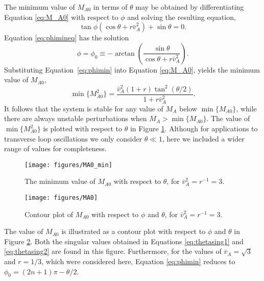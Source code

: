 The minimum value of $M_{A0}$ in terms of $\theta$ may be obtained by differentiating Equation \eqref{eq:M_A0} with respect to $\phi$ and solving the resulting equation,
\begin{equation}
\label{eq:phimineq}
\tan\phi(\cos\theta + r \bar v_A^2) + \sin\theta = 0.
\end{equation}
Equation \eqref{eq:phimineq} has the solution
%
\begin{equation}
\label{eq:phimin}
\phi = \phi_0 \equiv -\arctan \left(\frac{ \sin\theta}{\cos\theta + r \bar v_{A}^2}\right).
\end{equation}
%
Substituting Equation~\eqref{eq:phimin} into Equation \eqref{eq:M_A0}, yields the minimum value of $M_{A0}$,
%
\begin{equation}
\label{eq:M_A0min}
\min \{ M_{A0}^2 \} = \frac{\bar v_{A}^2 (1 + r)\tan^2(\theta/2)}{1 + r \bar v_{A}^2} .
\end{equation}
%
It follows that the system is stable for any value of $M_A$ below $\min\{M_{A0}\}$, while there are always unstable perturbations when $M_A > \min\{M_{A0}\}$.
The value of $\min \{ M_{A0}^2 \}$ is plotted with respect to $\theta$ in Figure \ref{fig:M_A0_min}.
Although for applications to transverse loop oscillations we only consider $\theta \ll 1$, here we included a wider range of values for completeness.

\begin{figure}[t]
\centering
\texttt{[image: figures/MA0\_min]}
\caption{The minimum value of $M_{A0}$ with respect to $\theta$, for $\bar v_A^2 = r^{-1} = 3$.}
\label{fig:M_A0_min}
\end{figure}

\begin{figure}[t]
\centering
\texttt{[image: figures/MA0]}
\caption{Contour plot of $M_{A0}$ with respect to $\phi$ and $\theta$, for $\bar v_A^2 = r^{-1} = 3$.}
\label{fig:M_A0}
\end{figure}

The value of $M_{A 0}$ is illustrated as a contour plot with respect to $\phi$ and $\theta$ in Figure \ref{fig:M_A0}.
Both the singular values obtained in Equations \eqref{eq:thetasing1} and \eqref{eq:thetasing2} are found in this figure.
Furthermore, for the values of $\bar v_A = \sqrt{3}$ and $r = 1/3$, which were considered here, Equation \eqref{eq:phimin} reduces to $\phi_0 = (2 n + 1) \pi -\theta/2$.

